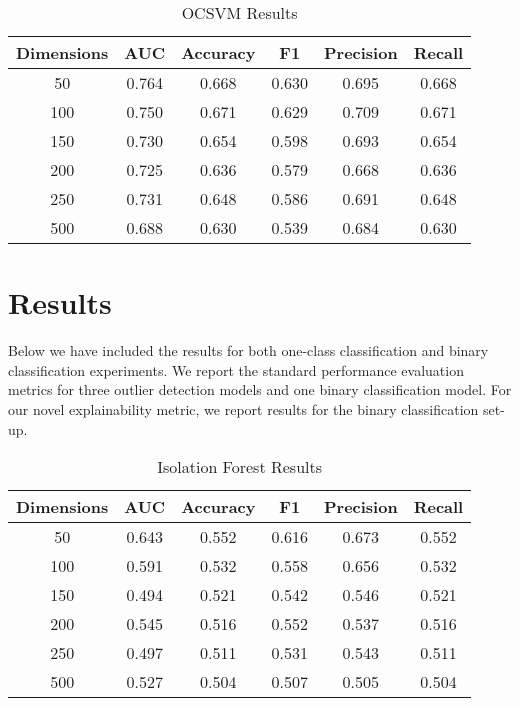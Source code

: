 \documentclass{article}
\begin{document}
\begin{table}
 \caption{OCSVM Results}
  \centering
  \begin{tabular}{|c|c|c|c|c|c|}
    \hline
    \rowcolor{lightgray} \textbf{Dimensions} & \textbf{AUC} & \textbf{Accuracy} & \textbf{F1} & \textbf{Precision} & \textbf{Recall} \\
    \hline
    50 & \cellcolor{green} 0.764 & 0.668 & \cellcolor{green} 0.630 & 0.695 & 0.668 \\
    \hline
    \cellcolor{green} 100 & 0.750 & \cellcolor{green} 0.671 & 0.629 & \cellcolor{green} 0.709 & \cellcolor{green} 0.671 \\
    \hline
    150 & 0.730 & 0.654 & 0.598 & 0.693 & 0.654 \\
    \hline
    200 & 0.725 & 0.636 & 0.579 & 0.668 & 0.636 \\
    \hline
    250 & 0.731 & 0.648 & 0.586 & 0.691 & 0.648 \\
    \hline
    500 & 0.688 & 0.630 & 0.539 & 0.684 & 0.630 \\
    \hline
  \end{tabular}
  \label{tab:ocsvm}
\end{table}

\hypertarget{results}{%
\section{Results}\label{results}}

\label{sec:results} Below we have included the results for both
one-class classification and binary classification experiments. We
report the standard performance evaluation metrics for three outlier
detection models and one binary classification model. For our novel
explainability metric, we report results for the binary classification
set-up.

\begin{table}
 \caption{Isolation Forest Results}
  \centering
  \begin{tabular}{|c|c|c|c|c|c|}
    \hline
    \rowcolor{lightgray} \textbf{Dimensions} & \textbf{AUC} & \textbf{Accuracy} & \textbf{F1} & \textbf{Precision} & \textbf{Recall} \\
    \hline
    \rowcolor{green} 50 & 0.643 & 0.552 & 0.616 & 0.673 & 0.552 \\
    \hline
    100 & 0.591 & 0.532 & 0.558 & 0.656 & 0.532 \\
    \hline
    150 & 0.494 & 0.521 & 0.542 & 0.546 & 0.521 \\
    \hline
    200 & 0.545 & 0.516 & 0.552 & 0.537 & 0.516 \\
    \hline
    250 & 0.497 & 0.511 & 0.531 & 0.543 & 0.511 \\
    \hline
    500 & 0.527 & 0.504 & 0.507 & 0.505 & 0.504 \\
    \hline
  \end{tabular}
  \label{tab:iforest}
\end{table}
\end{document}
